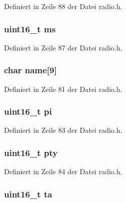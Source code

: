 Definiert in Zeile 88 der Datei radio.\+h.

\hypertarget{structradio__rds_a8d03256977e8f265177523adc9bab6c0}{}
\subsubsection[{ms}]{\setlength{\rightskip}{0pt plus 5cm}uint16\+\_\+t ms}\label{structradio__rds_a8d03256977e8f265177523adc9bab6c0}


Definiert in Zeile 87 der Datei radio.\+h.

\hypertarget{structradio__rds_a00c5e915306c0baea463b99ba6c09c4f}{}
\subsubsection[{name}]{\setlength{\rightskip}{0pt plus 5cm}char name\mbox{[}9\mbox{]}}\label{structradio__rds_a00c5e915306c0baea463b99ba6c09c4f}


Definiert in Zeile 81 der Datei radio.\+h.

\hypertarget{structradio__rds_ad1803744db28ac0d226ec8da9134598e}{}
\subsubsection[{pi}]{\setlength{\rightskip}{0pt plus 5cm}uint16\+\_\+t pi}\label{structradio__rds_ad1803744db28ac0d226ec8da9134598e}


Definiert in Zeile 83 der Datei radio.\+h.

\hypertarget{structradio__rds_a6a555813c441b0e0dce51020817fa68e}{}
\subsubsection[{pty}]{\setlength{\rightskip}{0pt plus 5cm}uint16\+\_\+t pty}\label{structradio__rds_a6a555813c441b0e0dce51020817fa68e}


Definiert in Zeile 84 der Datei radio.\+h.

\hypertarget{structradio__rds_aaa7c4cc5a934d489d475d0f7d26e437c}{}
\subsubsection[{ta}]{\setlength{\rightskip}{0pt plus 5cm}uint16\+\_\+t ta}\label{structradio__rds_aaa7c4cc5a934d489d475d0f7d26e437c}


